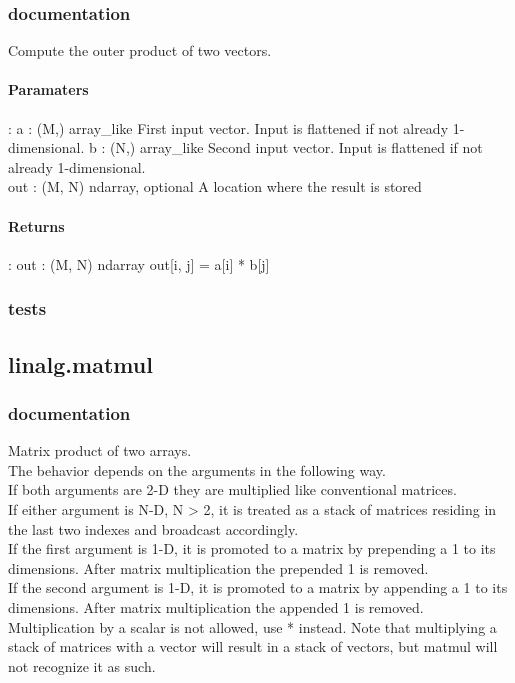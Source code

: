 \subsubsection{documentation}
Compute the outer product of two vectors.

\paragraph{Paramaters}: 
a : (M,) array\_like
First input vector. Input is flattened if not already 1-dimensional.
b : (N,) array\_like
Second input vector. Input is flattened if not already 1-dimensional.\\
out : (M, N) ndarray, optional
A location where the result is stored\\
\paragraph{Returns}:    
out : (M, N) ndarray
out[i, j] = a[i] * b[j]

\subsubsection{tests}

\subsection{linalg.matmul}
\subsubsection{documentation}
Matrix product of two arrays.\\

The behavior depends on the arguments in the following way.\\

If both arguments are 2-D they are multiplied like conventional matrices.\\
If either argument is N-D, N > 2, it is treated as a stack of matrices residing in the last two indexes and broadcast accordingly.\\
If the first argument is 1-D, it is promoted to a matrix by prepending a 1 to its dimensions. After matrix multiplication the prepended 1 is removed.\\
If the second argument is 1-D, it is promoted to a matrix by appending a 1 to its dimensions. After matrix multiplication the appended 1 is removed.\\
Multiplication by a scalar is not allowed, use * instead. Note that multiplying a stack of matrices with a vector will result in a stack of vectors, but matmul will not recognize it as such.\\

